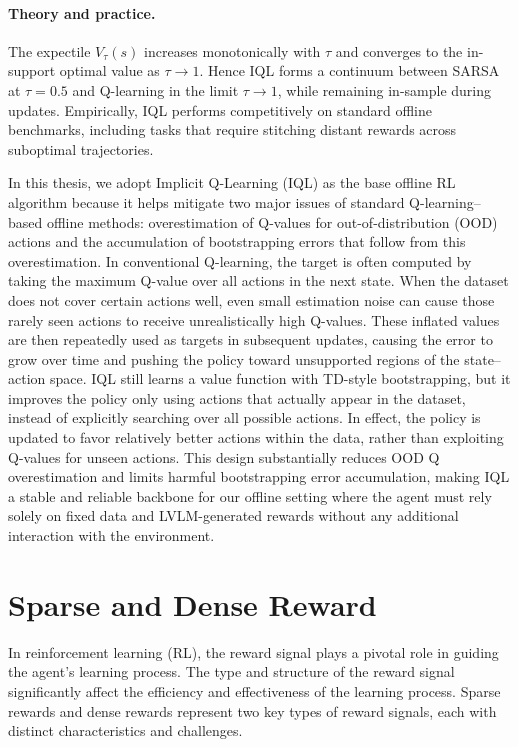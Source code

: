 \documentclass[master,english,final]{kaist-ucs}
\begin{document}
\paragraph{Theory and practice.}
The expectile $V_\tau(s)$ increases monotonically with $\tau$ and converges to the in-support optimal value as $\tau\to 1$.
Hence IQL forms a continuum between SARSA at $\tau=0.5$ and Q-learning in the limit $\tau\to 1$, while remaining in-sample during updates.
Empirically, IQL performs competitively on standard offline benchmarks, including tasks that require stitching distant rewards across suboptimal trajectories.

In this thesis, we adopt Implicit Q-Learning (IQL) as the base offline RL algorithm because it helps mitigate two major issues of standard Q-learning–based offline methods: overestimation of Q-values for out-of-distribution (OOD) actions and the accumulation of bootstrapping errors that follow from this overestimation. In conventional Q-learning, the target is often computed by taking the maximum Q-value over all actions in the next state. When the dataset does not cover certain actions well, even small estimation noise can cause those rarely seen actions to receive unrealistically high Q-values. These inflated values are then repeatedly used as targets in subsequent updates, causing the error to grow over time and pushing the policy toward unsupported regions of the state–action space. IQL still learns a value function with TD-style bootstrapping, but it improves the policy only using actions that actually appear in the dataset, instead of explicitly searching over all possible actions. In effect, the policy is updated to favor relatively better actions within the data, rather than exploiting Q-values for unseen actions. This design substantially reduces OOD Q overestimation and limits harmful bootstrapping error accumulation, making IQL a stable and reliable backbone for our offline setting where the agent must rely solely on fixed data and LVLM-generated rewards without any additional interaction with the environment.


\section{Sparse and Dense Reward}
In reinforcement learning (RL), the reward signal plays a pivotal role in guiding the agent's learning process. The type and structure of the reward signal significantly affect the efficiency and effectiveness of the learning process. Sparse rewards and dense rewards represent two key types of reward signals, each with distinct characteristics and challenges.
\end{document}
